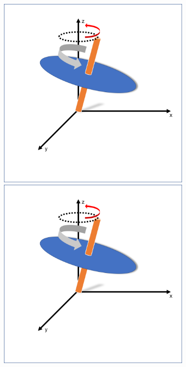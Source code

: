 \documentclass[10pt]{beamer}
\begin{document}
\begin{frame}
\begin{figure}
	\begin{minipage}{0.49\textwidth}
		\centering
		\includegraphics[width=0.85\textwidth]{sphere1.png}
	\end{minipage}
	\begin{minipage}{0.49\textwidth}
		\centering
		\includegraphics[width=0.85\textwidth]{sphere1.png}
	\end{minipage}


\end{figure}
\end{frame}
\end{document}

